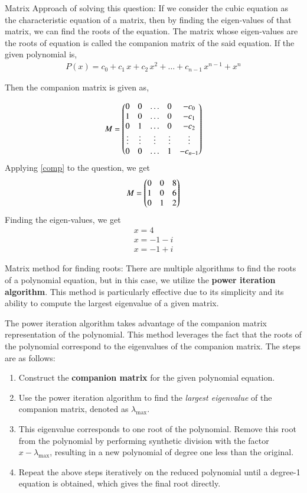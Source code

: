 \documentclass[journal]{IEEEtran}
\begin{document}
 Matrix Approach of solving this question: 
 If we consider the cubic equation as the characteristic equation of a matrix, then by finding the eigen-values of that matrix, we can find the roots of the equation. The matrix whose eigen-values are the roots of equation is called the companion matrix of the said equation.
 If the given polynomial is,
 \begin{align}
 	P(x) = c_0 + c_1\,x + c_2\,x^2 + \dots + c_{n-1}\,x^{n-1} + x^n
 \end{align}
 
 Then the companion matrix is given as,
 
 \begin{align}
 	M = \begin{pmatrix}0 & 0 & \dots & 0 & -c_0\\1 & 0 & \dots & 0 & -c_1\\0 & 1 & \dots & 0 & -c_2\\\vdots & \vdots & \vdots & \vdots &\vdots \\0 & 0 & \dots & 1 & -c_{n-1}\end{pmatrix} \label{comp}
 \end{align}
 Applying \eqref{comp} to the question, we get
 \begin{align}
 	M = \begin{pmatrix}0 & 0 & 8 \\ 1 & 0 & 6 \\ 0 & 1 & 2\end{pmatrix}
 \end{align}
 Finding the eigen-values, we get
 \begin{align}
 	x = 4 \\
  	x = -1-i \\
   	x = -1+i 
 \end{align}
 
 Matrix method for finding roots:  
 There are multiple algorithms to find the roots of a polynomial equation, but in this case, we utilize the \textbf{power iteration algorithm}. This method is particularly effective due to its simplicity and its ability to compute the largest eigenvalue of a given matrix.  
 
 The power iteration algorithm takes advantage of the companion matrix representation of the polynomial. This method leverages the fact that the roots of the polynomial correspond to the eigenvalues of the companion matrix. The steps are as follows:
 
 \begin{enumerate}
 	\item Construct the \textbf{companion matrix} for the given polynomial equation.
 	\item Use the power iteration algorithm to find the \textit{largest eigenvalue} of the companion matrix, denoted as $\lambda_{\text{max}}$.
 	\item This eigenvalue corresponds to one root of the polynomial. Remove this root from the polynomial by performing synthetic division with the factor $x - \lambda_{\text{max}}$, resulting in a new polynomial of degree one less than the original.
 	\item Repeat the above steps iteratively on the reduced polynomial until a degree-1 equation is obtained, which gives the final root directly.
 \end{enumerate}  
 
\end{document}
